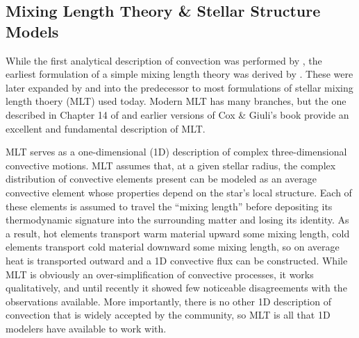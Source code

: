 \subsection{Mixing Length Theory \& Stellar Structure Models}
While the first analytical description of convection was performed by \citet{rayleigh1916}, the earliest formulation of a simple mixing length theory was derived by \citet{prandtl1925}.
These were later expanded by \citet{vitense1953} and \citet{bohm-vitense1958} into the predecessor to most formulations of stellar mixing length thoery (MLT) used today.
Modern MLT has many branches, but the one described in Chapter 14 of \citet{weiss&all2004} and earlier versions of Cox \& Giuli's book provide an excellent and fundamental description of MLT.

MLT serves as a one-dimensional (1D) description of complex three-dimensional convective motions.
MLT assumes that, at a given stellar radius, the complex distribution of convective elements present can be modeled as an average convective element whose properties depend on the star's local structure.
Each of these elements is assumed to travel the ``mixing length'' before depositing its thermodynamic signature into the surrounding matter and losing its identity.
As a result, hot elements transport warm material upward some mixing length, cold elements transport cold material downward some mixing length, so on average heat is transported outward and a 1D convective flux can be constructed.
While MLT is obviously an over-simplification of convective processes, it works qualitatively, and until recently it showed few noticeable disagreements with the observations available.
More importantly, there is no other 1D description of convection that is widely accepted by the community, so MLT is all that 1D modelers have available to work with.

